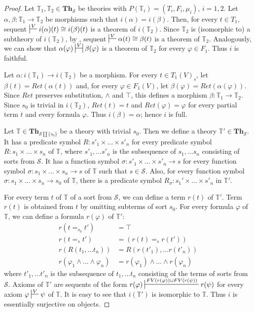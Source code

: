 \documentclass[reqno]{amsart}
\theoremstyle{definition}
\theoremstyle{remark}
\newcommand{\cat}[1]{\mathbf{#1}}
\newcommand{\Th}{\cat{Th}}
\numberwithin{figure}{section}
\begin{document}
\begin{proof}
Let $\mathbb{T}_1,\mathbb{T}_2 \in \Th_\mathcal{S}$ be theories with $P(\mathbb{T}_i) = (T_i,F_i,\mu_i)$, $i = 1,2$.
Let $\alpha,\beta : \mathbb{T}_1 \to \mathbb{T}_2$ be morphisms such that $i(\alpha) = i(\beta)$.
Then, for every $t \in T_1$, sequent $\sststile{}{V} i(\alpha)(t) \cong i(\beta)(t)$ is a theorem of $i(\mathbb{T}_2)$.
Since $\mathbb{T}_2$ is (isomorphic to) a subtheory of $i(\mathbb{T}_2)$, by , sequent $\sststile{}{V} \alpha(t) \cong \beta(t)$ is a theorem of $\mathbb{T}_2$.
Analogously, we can show that $\alpha(\varphi) \ssststile{}{V} \beta(\varphi)$ is a theorem of $\mathbb{T}_2$ for every $\varphi \in F_1$.
Thus $i$ is faithful.

Let $\alpha : i(\mathbb{T}_1) \to i(\mathbb{T}_2)$ be a morphism.
For every $t \in T_1(V)_s$, let $\beta(t) = Ret(\alpha(t))$ and, for every $\varphi \in F_1(V)$, let $\beta(\varphi) = Ret(\alpha(\varphi))$.
Since $Ret$ preserves substitution, $\land$ and $\top$, this defines a morphism $\beta : \mathbb{T}_1 \to \mathbb{T}_2$.
Since $s_0$ is trivial in $i(\mathbb{T}_2)$, $Ret(t) = t$ and $Ret(\varphi) = \varphi$ for every partial term $t$ and every formula $\varphi$.
Thus $i(\beta) = \alpha$; hence $i$ is full.

Let $\mathbb{T} \in \Th_{\mathcal{S} \amalg \{ s_0 \}}$ be a theory with trivial $s_0$.
Then we define a theory $\mathbb{T}' \in \Th_\mathcal{S}$.
It has a predicate symbol $R : s'_1 \times \ldots \times s'_n$ for every predicate symbol $R : s_1 \times \ldots \times s_n$ of $\mathbb{T}$,
    where $s'_1, \ldots s'_n$ is the subsequence of $s_1, \ldots s_n$ consisting of sorts from $\mathcal{S}$.
It has a function symbol $\sigma : s'_1 \times \ldots \times s'_n \to s$ for every function symbol
    $\sigma : s_1 \times \ldots \times s_n \to s$ of $\mathbb{T}$ such that $s \in \mathcal{S}$.
Also, for every function symbol $\sigma : s_1 \times \ldots \times s_n \to s_0$ of $\mathbb{T}$,
    there is a predicate symbol $R_\sigma : s_1' \times \ldots \times s'_n$ in $\mathbb{T}'$.

For every term $t$ of $\mathbb{T}$ of a sort from $\mathcal{S}$, we can define a term $r(t)$ of $\mathbb{T}'$.
Term $r(t)$ is obtained from $t$ by omitting subterms of sort $s_0$.
For every formula $\varphi$ of $\mathbb{T}$, we can define a formula $r(\varphi)$ of $\mathbb{T}'$:
\begin{align*}
r(t =_{s_0} t') & = \top \\
r(t =_s t') & = (r(t) =_s r(t')) \\
r(R(t_1, \ldots t_n)) & = R(r(t'_1), \ldots r(t'_n)) \\
r(\varphi_1 \land \ldots \land \varphi_n) & = r(\varphi_1) \land \ldots \land r(\varphi_n)
\end{align*}
where $t'_1, \ldots t'_n$ is the subsequence of $t_1, \ldots t_n$ consisting of the terms of sorts from $\mathcal{S}$.
Axioms of $\mathbb{T}'$ are sequents of the form $r(\varphi) \sststile{}{FV(r(\varphi)) \cup FV(r(\psi))} r(\psi)$ for every axiom $\varphi \sststile{}{V} \psi$ of $\mathbb{T}$.
It is easy to see that $i(\mathbb{T}')$ is isomorphic to $\mathbb{T}$.
Thus $i$ is essentially surjective on objects.
\end{proof}
\end{document}
